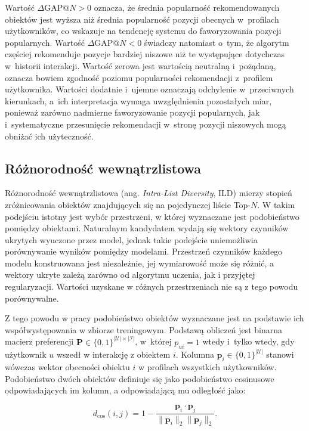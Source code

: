 Wartość $\Delta\text{GAP}@N > 0$ oznacza, że średnia popularność rekomendowanych obiektów jest wyższa niż średnia popularność pozycji obecnych w~profilach użytkowników, co wskazuje na tendencję systemu do faworyzowania pozycji popularnych. Wartość $\Delta\text{GAP}@N < 0$ świadczy natomiast o~tym, że algorytm częściej rekomenduje pozycje bardziej niszowe niż te występujące dotychczas w~historii interakcji. Wartość zerowa jest wartością neutralną i~pożądaną, oznacza bowiem zgodność poziomu popularności rekomendacji z~profilem użytkownika. Wartości dodatnie i~ujemne oznaczają odchylenie w~przeciwnych kierunkach, a~ich interpretacja wymaga uwzględnienia pozostałych miar, ponieważ zarówno nadmierne faworyzowanie pozycji popularnych, jak i~systematyczne przesunięcie rekomendacji w~stronę pozycji niszowych mogą obniżać ich użyteczność.

\subsection{Różnorodność wewnątrzlistowa}

Różnorodność wewnątrzlistowa (ang. \textit{Intra-List Diversity}, ILD) mierzy stopień zróżnicowania obiektów znajdujących się na pojedynczej liście Top-$N$. W takim podejściu istotny jest wybór przestrzeni, w której wyznaczane jest podobieństwo pomiędzy obiektami. Naturalnym kandydatem wydają się wektory czynników ukrytych wyuczone przez model, jednak takie podejście uniemożliwia porównywanie wyników pomiędzy modelami. Przestrzeń czynników każdego modelu konstruowana jest niezależnie, jej wymiarowość może się różnić, a wektory ukryte zależą zarówno od algorytmu uczenia, jak i przyjętej regularyzacji. Wartości uzyskane w różnych przestrzeniach nie są z tego powodu porównywalne.

Z tego powodu w pracy podobieństwo obiektów wyznaczane jest na podstawie ich współwystępowania w zbiorze treningowym. Podstawą obliczeń jest binarna macierz preferencji $\mathbf{P} \in \{0, 1\}^{|\mathcal{U}| \times |\mathcal{I}|}$, w~której $p_{ui} = 1$ wtedy i~tylko wtedy, gdy użytkownik $u$ wszedł w interakcję z obiektem $i$. Kolumna $\mathbf{p}_i \in \{0,1\}^{|\mathcal{U}|}$ stanowi wówczas wektor obecności obiektu $i$ w profilach wszystkich użytkowników. Podobieństwo dwóch obiektów definiuje się jako podobieństwo cosinusowe odpowiadających im kolumn, a odpowiadającą mu odległość jako:

\begin{equation}
    d_{\text{cos}}(i, j) = 1 - \frac{\mathbf{p}_i \cdot \mathbf{p}_j}{\|\mathbf{p}_i\|_2 \|\mathbf{p}_j\|_2}.
\end{equation}

